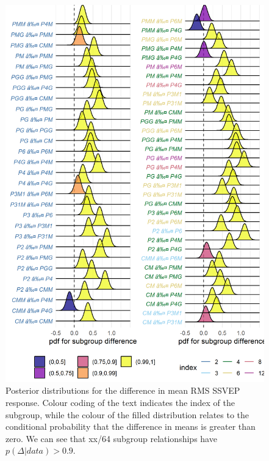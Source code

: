 \documentclass[9pt,twocolumn,twoside,lineno]{pnas-new}
\begin{document}
\begin{figure}[tbh]
\centering
\includegraphics[width=1\linewidth]{../analysis/plots/subgroup_comp_eeg_rms.png}
\caption{Posterior distributions for the difference in mean RMS SSVEP response. Colour coding of the text indicates the index of the subgroup, while the colour of the filled distribution relates to the conditional probability that the difference in means is greater than zero. We can see that xx/64 subgroup relationships have $p(\Delta|data)>0.9$.}
\label{fig:eeg_comp}
\end{figure}
\end{document}
